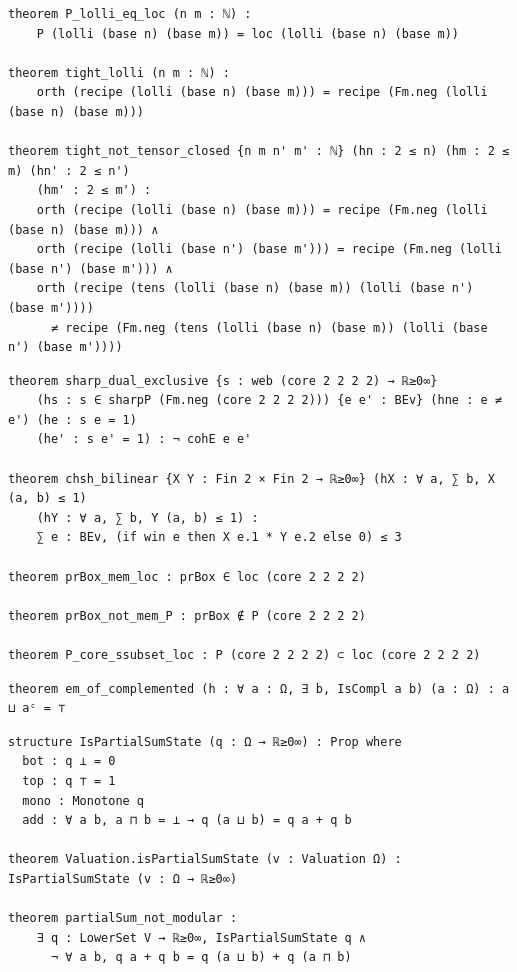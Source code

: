 \label{lean:tight-tensor}
\begin{lstlisting}
theorem P_lolli_eq_loc (n m : ℕ) :
    P (lolli (base n) (base m)) = loc (lolli (base n) (base m))

theorem tight_lolli (n m : ℕ) :
    orth (recipe (lolli (base n) (base m))) = recipe (Fm.neg (lolli (base n) (base m)))

theorem tight_not_tensor_closed {n m n' m' : ℕ} (hn : 2 ≤ n) (hm : 2 ≤ m) (hn' : 2 ≤ n')
    (hm' : 2 ≤ m') :
    orth (recipe (lolli (base n) (base m))) = recipe (Fm.neg (lolli (base n) (base m))) ∧
    orth (recipe (lolli (base n') (base m'))) = recipe (Fm.neg (lolli (base n') (base m'))) ∧
    orth (recipe (tens (lolli (base n) (base m)) (lolli (base n') (base m'))))
      ≠ recipe (Fm.neg (tens (lolli (base n) (base m)) (lolli (base n') (base m'))))
\end{lstlisting}

\label{lean:bell}
\begin{lstlisting}
theorem sharp_dual_exclusive {s : web (core 2 2 2 2) → ℝ≥0∞}
    (hs : s ∈ sharpP (Fm.neg (core 2 2 2 2))) {e e' : BEv} (hne : e ≠ e') (he : s e = 1)
    (he' : s e' = 1) : ¬ cohE e e'

theorem chsh_bilinear {X Y : Fin 2 × Fin 2 → ℝ≥0∞} (hX : ∀ a, ∑ b, X (a, b) ≤ 1)
    (hY : ∀ a, ∑ b, Y (a, b) ≤ 1) :
    ∑ e : BEv, (if win e then X e.1 * Y e.2 else 0) ≤ 3

theorem prBox_mem_loc : prBox ∈ loc (core 2 2 2 2)

theorem prBox_not_mem_P : prBox ∉ P (core 2 2 2 2)

theorem P_core_ssubset_loc : P (core 2 2 2 2) ⊂ loc (core 2 2 2 2)
\end{lstlisting}

\label{lean:em-of-complemented}
\begin{lstlisting}
theorem em_of_complemented (h : ∀ a : Ω, ∃ b, IsCompl a b) (a : Ω) : a ⊔ aᶜ = ⊤
\end{lstlisting}

\label{lean:partial-sum}
\begin{lstlisting}
structure IsPartialSumState (q : Ω → ℝ≥0∞) : Prop where
  bot : q ⊥ = 0
  top : q ⊤ = 1
  mono : Monotone q
  add : ∀ a b, a ⊓ b = ⊥ → q (a ⊔ b) = q a + q b

theorem Valuation.isPartialSumState (v : Valuation Ω) : IsPartialSumState (v : Ω → ℝ≥0∞)

theorem partialSum_not_modular :
    ∃ q : LowerSet V → ℝ≥0∞, IsPartialSumState q ∧
      ¬ ∀ a b, q a + q b = q (a ⊔ b) + q (a ⊓ b)
\end{lstlisting}

